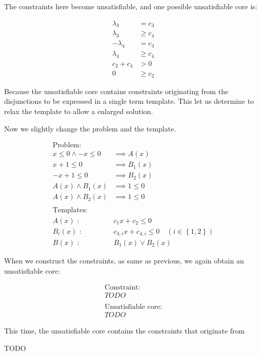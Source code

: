 \documentclass[a4paper,12pt]{article}
\begin{document}
The constraints here become unsatisfiable, and one possible
unsatisfiable core is:

\begin{align*}
\lambda_3 & = c_3 \\
\lambda_3 & \geq c_4 \\
- \lambda_4 & = c_3 \\
\lambda_4 & \geq c_4 \\
c_2 + c_4 & > 0 \\
0 & \geq c_2
\end{align*}

Because the unsatisfiable core contains constraints originating from
the disjunctions to be expressed in a single term template. This let
us determine to relax the template to allow a enlarged solution.

Now we slightly change the problem and the template.

\begin{align*}
\text{Problem:} \\
x \leq 0 \wedge -x \leq 0 & \implies A(x) \\
x+1 \leq 0 & \implies B_1(x) \\
-x+1 \leq 0 & \implies B_2(x) \\
A(x) \wedge B_1(x) & \implies 1 \leq 0 \\
A(x) \wedge B_2(x) & \implies 1 \leq 0 \\
\\
\text{Templates:} \\
A(x) \text{ : } & c_1 x + c_2 \leq 0 \\
B_i(x) \text{ : } & c_{3,i} x + c_{4,i} \leq 0 \quad (i \in \left\lbrace 1,2 \right\rbrace ) \\
B(x) \text{ : } & B_1(x) \vee B_2(x)
\end{align*}

When we construct the constraints, as same as previous, we again
obtain an unsatisfiable core:

\begin{align*}
\text{Constraint:} \\
TODO \\
\\
\text{Unsatisfiable core:} \\
TODO
\end{align*}

This time, the unsatisfiable core contains the constraints that
originate from

TODO
\end{document}
